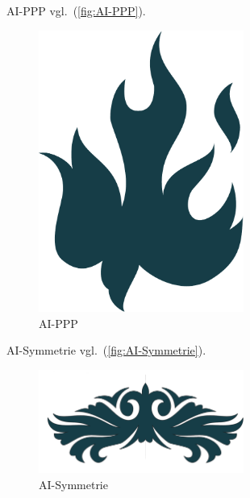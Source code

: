 AI-PPP vgl.~(\autoref{fig:AI-PPP}).

\begin{figure}[!hb]%
\centering
\includegraphics[width=0.6\textwidth]{Grafiken/AI-PPP.pdf}
\caption{AI-PPP}
\label{fig:AI-PPP}%
\end{figure}

AI-Symmetrie vgl.~(\autoref{fig:AI-Symmetrie}).

\begin{figure}[!hb]%
\centering
\includegraphics[width=0.6\textwidth]{Grafiken/AI-Symmetrie.pdf}
\caption{AI-Symmetrie}
\label{fig:AI-Symmetrie}%
\end{figure}

